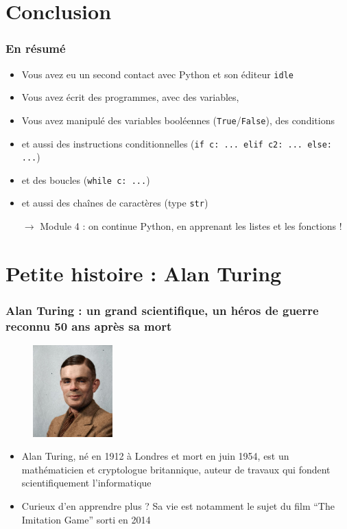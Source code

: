 \documentclass{beamer}
\newcommand{\mypause}{~}
\newcommand{\pyth}{{\sc Python}}
\newcommand{\prog}[1]{\alert{\texttt{#1}}}
\begin{document}
\section{Conclusion}
\frame
{
\frametitle{En résumé}
\begin{itemize}
\item Vous avez eu un second contact avec \alert{\pyth{}} et son éditeur \alert{\texttt{idle}}\mypause{}
\item Vous avez écrit des programmes, avec des variables,\mypause{}
\item Vous avez manipulé des variables booléennes (\prog{True}/\prog{False}), des conditions
\item et aussi des instructions conditionnelles (\prog{if c: ... elif c2: ... else: ...})\mypause{}
\item et des boucles (\prog{while c: ...})\mypause{}
\item et aussi des chaînes de caractères (type \prog{str})

\item[$\rightarrow$] Module 4 : on continue \pyth{}, en apprenant les \alert{listes} et les \alert{fonctions} !
\end{itemize}
}


\section{Petite histoire : Alan Turing}
\frame
{
\frametitle{Alan Turing : un grand scientifique, un héros de guerre reconnu 50 ans après sa mort}
\vspace*{5pt}
\begin{figure}
  \includegraphics[height=100pt]{Alan_Turing_colorized.jpg}
\end{figure}
\begin{itemize}
  \item Alan Turing, né en 1912 à Londres et mort en juin 1954, est un mathématicien et cryptologue britannique, auteur de travaux qui fondent scientifiquement l'informatique
  \item Curieux d'en apprendre plus ? Sa vie est notamment le sujet du film ``The Imitation Game'' sorti en 2014
\end{itemize}
}
\end{document}
